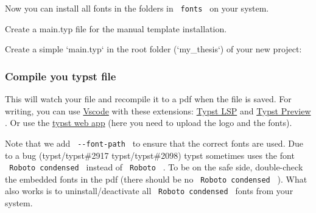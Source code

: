 Now you can install all fonts in the folders in \texttt{\ fonts\ } on
your system.

Create a main.typ file for the manual template installation.

Create a simple `main.typ` in the root folder (`my\_thesis`) of your new
project:

\begin{Shaded}
\begin{Highlighting}[]
\OperatorTok{:}

\OperatorTok{:}\NormalTok{(}
\OperatorTok{:}\NormalTok{ [}
\NormalTok{  ]}\OperatorTok{,}
\OperatorTok{:} \OperatorTok{,}
\OperatorTok{:} 
\NormalTok{)}

\OperatorTok{=}
\end{Highlighting}
\end{Shaded}

\subsubsection{Compile you typst file}\label{compile-you-typst-file}

\begin{Shaded}
\begin{Highlighting}[]
 
\end{Highlighting}
\end{Shaded}

This will watch your file and recompile it to a pdf when the file is
saved. For writing, you can use
\href{https://code.visualstudio.com/}{Vscode} with these extensions:
\href{https://marketplace.visualstudio.com/items?itemName=nvarner.typst-lsp}{Typst
LSP} and
\href{https://marketplace.visualstudio.com/items?itemName=mgt19937.typst-preview}{Typst
Preview} . Or use the \href{https://typst.app/}{typst web app} (here you
need to upload the logo and the fonts).

Note that we add \texttt{\ -\/-font-path\ } to ensure that the correct
fonts are used. Due to a bug (typst/typst\#2917 typst/typst\#2098) typst
sometimes uses the font \texttt{\ Roboto\ condensed\ } instead of
\texttt{\ Roboto\ } . To be on the safe side, double-check the embedded
fonts in the pdf (there should be no \texttt{\ Roboto\ condensed\ } ).
What also works is to uninstall/deactivate all
\texttt{\ Roboto\ condensed\ } fonts from your system.

